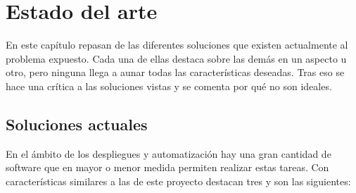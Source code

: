 \chapter{Estado del arte}

En este capítulo repasan de las diferentes soluciones que existen actualmente al problema expuesto. Cada una de ellas destaca sobre las demás en un aspecto u otro, pero ninguna llega a aunar todas las características deseadas. Tras eso se hace una crítica a las soluciones vistas y se comenta por qué no son ideales.

\section{Soluciones actuales}

En el ámbito de los despliegues y automatización hay una gran cantidad de software que en mayor o menor medida permiten realizar estas tareas. Con características similares a las de este proyecto destacan tres y son las siguientes:

